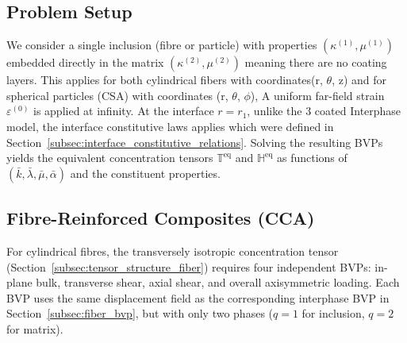 \documentclass[oneside, 12pt, a4paper, bibliography=totoc]{book}
\begin{document}
\subsection{Problem Setup}
\label{subsec:interface_problem_setup}

We consider a single inclusion (fibre or particle) with properties $(\kappa^{(1)}, \mu^{(1)})$ embedded directly in the matrix $(\kappa^{(2)}, \mu^{(2)})$ meaning there are no coating layers. This applies for both cylindrical fibers with coordinates(r, $\theta$, z) and for spherical particles (CSA) with coordinates (r, $\theta$, $\phi$), 
A uniform far-field strain $\varepsilon^{(0)}$ is applied at infinity. At the interface $r = r_1$, unlike the 3 coated Interphase model, the interface constitutive laws applies which were defined in Section~\ref{subsec:interface_constitutive_relations}. Solving the resulting BVPs yields the equivalent concentration tensors $\mathbb{T}^{\text{eq}}$ and $\mathbb{H}^{\text{eq}}$ as functions of $(\bar{k}, \bar{\lambda}, \bar{\mu}, \bar{\alpha})$ and the constituent properties.

\subsection{Fibre-Reinforced Composites (CCA)}
\label{subsec:interface_bvp}

For cylindrical fibres, the transversely isotropic concentration tensor (Section~\ref{subsec:tensor_structure_fiber}) requires four independent BVPs: in-plane bulk, transverse shear, axial shear, and overall axisymmetric loading. Each BVP uses the same displacement field as the corresponding interphase BVP in Section~\ref{subsec:fiber_bvp}, but with only two phases ($q = 1$ for inclusion, $q = 2$ for matrix).
\end{document}
